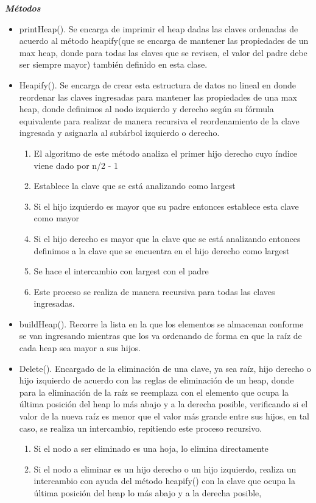 \documentclass{article}
\begin{document}
\textit{\textbf{Métodos}}
\begin{itemize}
\item printHeap(). Se encarga de imprimir el heap dadas las claves ordenadas de acuerdo al método heapify(que se encarga de mantener las propiedades de un max heap, donde para todas las claves que se revisen, el valor del padre debe ser siempre mayor) también definido en esta clase. 
\item Heapify(). Se encarga de crear esta estructura de datos no lineal en donde reordenar las claves ingresadas para mantener las propiedades de una max heap, donde definimos al nodo izquierdo y derecho según su fórmula equivalente para realizar de manera recursiva el reordenamiento de la clave ingresada y asignarla al subárbol izquierdo o derecho.
\begin{enumerate}
    \item El algoritmo de este método analiza el primer hijo derecho cuyo índice viene dado por n/2 - 1
    \item Establece la clave que se está analizando como largest
    \item Si el hijo izquierdo es mayor que su padre entonces establece esta clave como mayor
    \item Si el hijo derecho es mayor que la clave que se está analizando entonces definimos a la clave que se encuentra en el hijo derecho como largest    
    \item Se hace el intercambio con largest con el padre 
    \item Este proceso se realiza de manera recursiva para todas las claves ingresadas.
\end{enumerate}
\item buildHeap(). Recorre la lista en la que los elementos se almacenan conforme se van ingresando mientras que los va ordenando de forma en que la raíz de cada heap sea mayor a sus hijos.
\item Delete(). Encargado de la eliminación de una clave, ya sea raíz, hijo derecho o hijo izquierdo de acuerdo con las reglas de eliminación de un heap, donde para la eliminación de la raíz se reemplaza con el elemento que ocupa la última posición del heap lo más abajo y a la derecha posible, verificando si el valor de la nueva raíz es menor que el valor más grande entre sus hijos, en tal caso, se realiza un intercambio, repitiendo este proceso recursivo.
\begin{enumerate}
    \item Si el nodo a ser eliminado es una hoja, lo elimina directamente
    \item Si el nodo a eliminar es un hijo derecho o un hijo izquierdo, realiza un intercambio con ayuda del método heapify() con la clave que ocupa la última posición del heap lo más abajo y a la derecha posible,
\end{enumerate}
    

\end{itemize}
\end{document}
